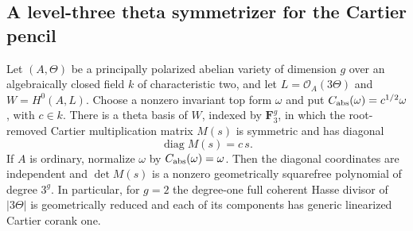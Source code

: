 \subsection{A level-three theta symmetrizer for the Cartier pencil}
\label{subsec:ppav-theta-Cartier-symmetrizer}

\begin{theorem}\label{thm:ppav-level3-Cartier-symmetric}
Let $(A,\Theta)$ be a principally polarized abelian variety of dimension
$g$ over an algebraically closed field $k$ of characteristic two, and let
$L=\mathcal O_A(3\Theta)$ and $W=H^0(A,L)$.
Choose a nonzero invariant top form $\omega$ and put
$C_{\rm abs}(\omega)=c^{1/2}\omega$, with $c\in k$.
There is a theta basis of $W$, indexed by $\mathbf F_3^g$, in which
the root-removed Cartier multiplication matrix $M(s)$ is symmetric
and has diagonal
\[
                         \operatorname{diag}M(s)=c\,s.
\]
If $A$ is ordinary, normalize $\omega$ by $C_{\rm abs}(\omega)=\omega$.
Then the diagonal coordinates are independent and $\det M(s)$ is a
nonzero geometrically squarefree polynomial of degree $3^g$.
In particular, for $g=2$ the degree-one full coherent Hasse divisor of
$|3\Theta|$ is geometrically reduced and each of its components has
generic linearized Cartier corank one.
\end{theorem}

